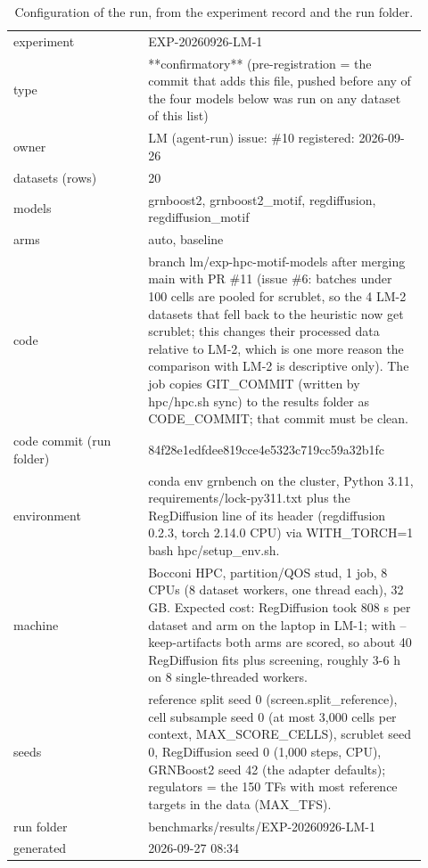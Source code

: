 \begin{table}[H]\centering\small
\caption{Configuration of the run, from the experiment record and the run folder.}
\begin{tabular}{p{0.3\linewidth}p{0.62\linewidth}}\toprule
experiment & EXP-20260926-LM-1 \\
type & **confirmatory** (pre-registration = the commit that adds this file, pushed before any of the four models below was run on any dataset of this list) \\
owner & LM (agent-run)   issue: \#10   registered: 2026-09-26 \\
datasets (rows) & 20 \\
models & grnboost2, grnboost2\_motif, regdiffusion, regdiffusion\_motif \\
arms & auto, baseline \\
code & branch lm/exp-hpc-motif-models after merging main with PR \#11 (issue \#6: batches under 100 cells are pooled for scrublet, so the 4 LM-2 datasets that fell back to the heuristic now get scrublet; this changes their processed data relative to LM-2, which is one more reason the comparison with LM-2 is descriptive only). The job copies GIT\_COMMIT (written by hpc/hpc.sh sync) to the results folder as CODE\_COMMIT; that commit must be clean. \\
code commit (run folder) & 84f28e1edfdee819cce4e5323c719cc59a32b1fc \\
environment & conda env grnbench on the cluster, Python 3.11, requirements/lock-py311.txt plus the RegDiffusion line of its header (regdiffusion 0.2.3, torch 2.14.0 CPU) via WITH\_TORCH=1 bash hpc/setup\_env.sh. \\
machine & Bocconi HPC, partition/QOS stud, 1 job, 8 CPUs (8 dataset workers, one thread each), 32 GB. Expected cost: RegDiffusion took 808 s per dataset and arm on the laptop in LM-1; with --keep-artifacts both arms are scored, so about 40 RegDiffusion fits plus screening, roughly 3-6 h on 8 single-threaded workers. \\
seeds & reference split seed 0 (screen.split\_reference), cell subsample seed 0 (at most 3,000 cells per context, MAX\_SCORE\_CELLS), scrublet seed 0, RegDiffusion seed 0 (1,000 steps, CPU), GRNBoost2 seed 42 (the adapter defaults); regulators = the 150 TFs with most reference targets in the data (MAX\_TFS). \\
run folder & benchmarks/results/EXP-20260926-LM-1 \\
generated & 2026-09-27 08:34 \\
\bottomrule\end{tabular}\end{table}
